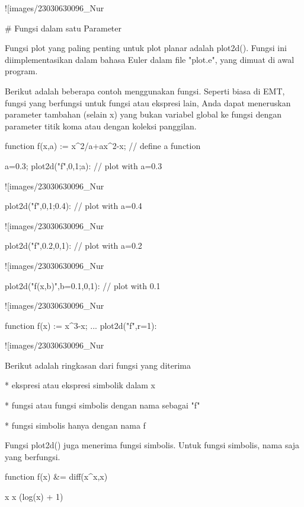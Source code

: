 \documentclass{article}
\begin{document}
![images/23030630096_Nur%

# Fungsi dalam satu Parameter

Fungsi plot yang paling penting untuk plot planar adalah plot2d().
Fungsi ini diimplementasikan dalam bahasa Euler dalam file "plot.e",
yang dimuat di awal program.


Berikut adalah beberapa contoh menggunakan fungsi. Seperti biasa di
EMT, fungsi yang berfungsi untuk fungsi atau ekspresi lain, Anda dapat
meneruskan parameter tambahan (selain x) yang bukan variabel global ke
fungsi dengan parameter titik koma atau dengan koleksi panggilan.


\>function f(x,a) := x^2/a+a\*x^2-x; // define a function

\>a=0.3; plot2d("f",0,1;a): // plot with a=0.3


![images/23030630096_Nur%

\>plot2d("f",0,1;0.4): // plot with a=0.4


![images/23030630096_Nur%

\>plot2d({{"f",0.2}},0,1): // plot with a=0.2


![images/23030630096_Nur%

\>plot2d({{"f(x,b)",b=0.1}},0,1): // plot with 0.1


![images/23030630096_Nur%

\>function f(x) := x^3-x; ...  
\>   plot2d("f",r=1):


![images/23030630096_Nur%

Berikut adalah ringkasan dari fungsi yang diterima


* 
ekspresi atau ekspresi simbolik dalam x

* 
fungsi atau fungsi simbolis dengan nama sebagai "f"

* 
fungsi simbolis hanya dengan nama f


Fungsi plot2d() juga menerima fungsi simbolis. Untuk fungsi simbolis,
nama saja yang berfungsi.


\>function f(x) &= diff(x^x,x)


    
                                x
                               x  (log(x) + 1)
    
\end{document}
